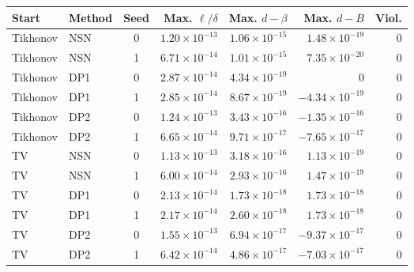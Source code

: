 \begingroup\small\setlength{\tabcolsep}{4pt}\renewcommand{\arraystretch}{1.1}
\begin{tabular}{@{}llcrrrr@{}}
\toprule
Start & Method & Seed & Max. $\ell/\delta$ & Max. $d-\beta$ & Max. $d-B$ & Viol. \\ \midrule
Tikhonov & NSN & 0 & $1.20\times10^{-13}$ & $1.06\times10^{-15}$ & $1.48\times10^{-19}$ & 0 \\
Tikhonov & NSN & 1 & $6.71\times10^{-14}$ & $1.01\times10^{-15}$ & $7.35\times10^{-20}$ & 0 \\
Tikhonov & DP1 & 0 & $2.87\times10^{-14}$ & $4.34\times10^{-19}$ & $0$ & 0 \\
Tikhonov & DP1 & 1 & $2.85\times10^{-14}$ & $8.67\times10^{-19}$ & $-4.34\times10^{-19}$ & 0 \\
Tikhonov & DP2 & 0 & $1.24\times10^{-13}$ & $3.43\times10^{-16}$ & $-1.35\times10^{-16}$ & 0 \\
Tikhonov & DP2 & 1 & $6.65\times10^{-14}$ & $9.71\times10^{-17}$ & $-7.65\times10^{-17}$ & 0 \\
TV & NSN & 0 & $1.13\times10^{-13}$ & $3.18\times10^{-16}$ & $1.13\times10^{-19}$ & 0 \\
TV & NSN & 1 & $6.00\times10^{-14}$ & $2.93\times10^{-16}$ & $1.47\times10^{-19}$ & 0 \\
TV & DP1 & 0 & $2.13\times10^{-14}$ & $1.73\times10^{-18}$ & $1.73\times10^{-18}$ & 0 \\
TV & DP1 & 1 & $2.17\times10^{-14}$ & $2.60\times10^{-18}$ & $1.73\times10^{-18}$ & 0 \\
TV & DP2 & 0 & $1.55\times10^{-13}$ & $6.94\times10^{-17}$ & $-9.37\times10^{-17}$ & 0 \\
TV & DP2 & 1 & $6.42\times10^{-14}$ & $4.86\times10^{-17}$ & $-7.03\times10^{-17}$ & 0 \\
\bottomrule
\end{tabular}\endgroup
